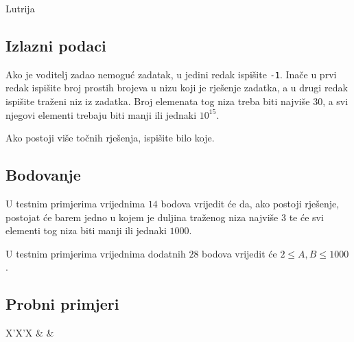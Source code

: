 \begin{statement}[
  problempoints=70,
  timelimit=2 sekunde,
  memorylimit=512 MiB,
]{Lutrija}
\subsection*{Izlazni podaci}
Ako je voditelj zadao nemoguć zadatak, u jedini redak ispišite \texttt{-1}.
Inače u prvi redak ispišite broj prostih brojeva u nizu koji je rješenje
zadatka, a u drugi redak ispišite traženi niz iz zadatka. Broj elemenata tog
niza treba biti najviše $30$, a svi njegovi elementi trebaju biti manji ili
jednaki $10^{15}$.

Ako postoji više točnih rješenja, ispišite bilo koje.

\subsection*{Bodovanje}
U testnim primjerima vrijednima $14$ bodova vrijedit će da, ako postoji rješenje,
postojat će barem jedno u kojem je duljina traženog niza najviše $3$ te će svi
elementi tog niza biti manji ili jednaki $1000$.

U testnim primjerima vrijednima dodatnih $28$ bodova vrijedit će
$2 \le A, B \le 1000$.

\subsection*{Probni primjeri}
\begin{tabularx}{\textwidth}{X'X'X}
 &
 &
\end{tabularx}

\end{statement}

